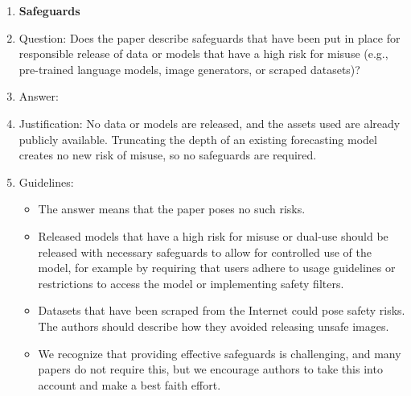 \begin{enumerate}
\item {\bf Safeguards}
    \item[] Question: Does the paper describe safeguards that have been put in place for responsible release of data or models that have a high risk for misuse (e.g., pre-trained language models, image generators, or scraped datasets)?
    \item[] Answer: \answerNA{}
    \item[] Justification: No data or models are released, and the assets used are already publicly available. Truncating the depth of an existing forecasting model creates no new risk of misuse, so no safeguards are required.
    \item[] Guidelines:
    \begin{itemize}
        \item The answer \answerNA{} means that the paper poses no such risks.
        \item Released models that have a high risk for misuse or dual-use should be released with necessary safeguards to allow for controlled use of the model, for example by requiring that users adhere to usage guidelines or restrictions to access the model or implementing safety filters. 
        \item Datasets that have been scraped from the Internet could pose safety risks. The authors should describe how they avoided releasing unsafe images.
        \item We recognize that providing effective safeguards is challenging, and many papers do not require this, but we encourage authors to take this into account and make a best faith effort.
    \end{itemize}


\end{enumerate}
